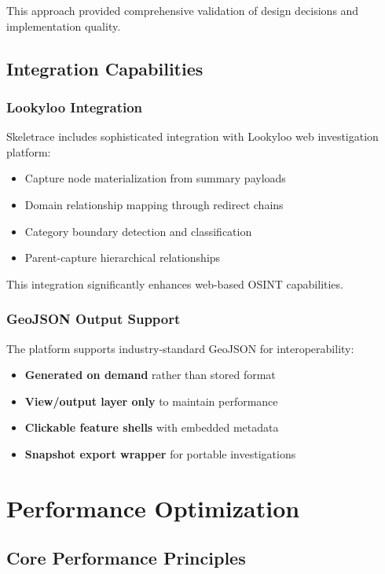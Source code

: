 \documentclass[12pt,a4paper]{article}
\begin{document}
This approach provided comprehensive validation of design decisions and implementation quality.

\subsection{Integration Capabilities}

\subsubsection{Lookyloo Integration}
Skeletrace includes sophisticated integration with Lookyloo web investigation platform:

\begin{itemize}
\item Capture node materialization from summary payloads
\item Domain relationship mapping through redirect chains
\item Category boundary detection and classification
\item Parent-capture hierarchical relationships
\end{itemize}

This integration significantly enhances web-based OSINT capabilities.

\subsubsection{GeoJSON Output Support}
The platform supports industry-standard GeoJSON for interoperability:

\begin{itemize}
\item \textbf{Generated on demand} rather than stored format
\item \textbf{View/output layer only} to maintain performance
\item \textbf{Clickable feature shells} with embedded metadata
\item \textbf{Snapshot export wrapper} for portable investigations
\end{itemize}

\section{Performance Optimization}

\subsection{Core Performance Principles}
\end{document}
